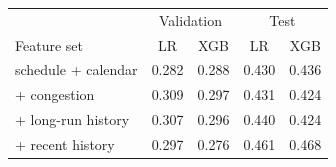 \begin{tabular}{lcccc}
\toprule
 & \multicolumn{2}{c}{Validation} & \multicolumn{2}{c}{Test} \\
Feature set & LR & XGB & LR & XGB \\
\midrule
schedule + calendar & 0.282 & 0.288 & 0.430 & 0.436 \\
+ congestion & 0.309 & 0.297 & 0.431 & 0.424 \\
+ long-run history & 0.307 & 0.296 & 0.440 & 0.424 \\
+ recent history & 0.297 & 0.276 & 0.461 & 0.468 \\
\bottomrule
\end{tabular}

